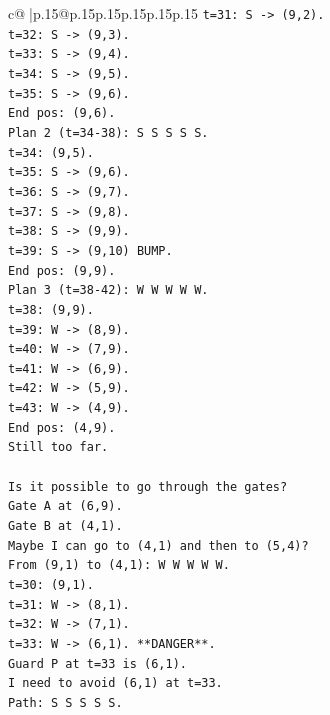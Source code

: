 \documentclass{article}
\begin{document}
{\begin{supertabular}{c@{$\;$}|p{.15\linewidth}@{}p{.15\linewidth}p{.15\linewidth}p{.15\linewidth}p{.15\linewidth}p{.15\linewidth}}
{{{\texttt{t=31: S {-}> (9,2).} \\
\texttt{t=32: S {-}> (9,3).} \\
\texttt{t=33: S {-}> (9,4).} \\
\texttt{t=34: S {-}> (9,5).} \\
\texttt{t=35: S {-}> (9,6).} \\
\texttt{End pos: (9,6).} \\
\texttt{Plan 2 (t=34{-}38): S S S S S.} \\
\texttt{t=34: (9,5).} \\
\texttt{t=35: S {-}> (9,6).} \\
\texttt{t=36: S {-}> (9,7).} \\
\texttt{t=37: S {-}> (9,8).} \\
\texttt{t=38: S {-}> (9,9).} \\
\texttt{t=39: S {-}> (9,10) BUMP.} \\
\texttt{End pos: (9,9).} \\
\texttt{Plan 3 (t=38{-}42): W W W W W.} \\
\texttt{t=38: (9,9).} \\
\texttt{t=39: W {-}> (8,9).} \\
\texttt{t=40: W {-}> (7,9).} \\
\texttt{t=41: W {-}> (6,9).} \\
\texttt{t=42: W {-}> (5,9).} \\
\texttt{t=43: W {-}> (4,9).} \\
\texttt{End pos: (4,9).} \\
\texttt{Still too far.} \\
\\ 
\texttt{Is it possible to go through the gates?} \\
\texttt{Gate A at (6,9).} \\
\texttt{Gate B at (4,1).} \\
\texttt{Maybe I can go to (4,1) and then to (5,4)?} \\
\texttt{From (9,1) to (4,1): W W W W W.} \\
\texttt{t=30: (9,1).} \\
\texttt{t=31: W {-}> (8,1).} \\
\texttt{t=32: W {-}> (7,1).} \\
\texttt{t=33: W {-}> (6,1). **DANGER**.} \\
\texttt{Guard P at t=33 is (6,1).} \\
\texttt{I need to avoid (6,1) at t=33.} \\
\texttt{Path: S S S S S.} \\
}}}
\end{supertabular}}
\end{document}
